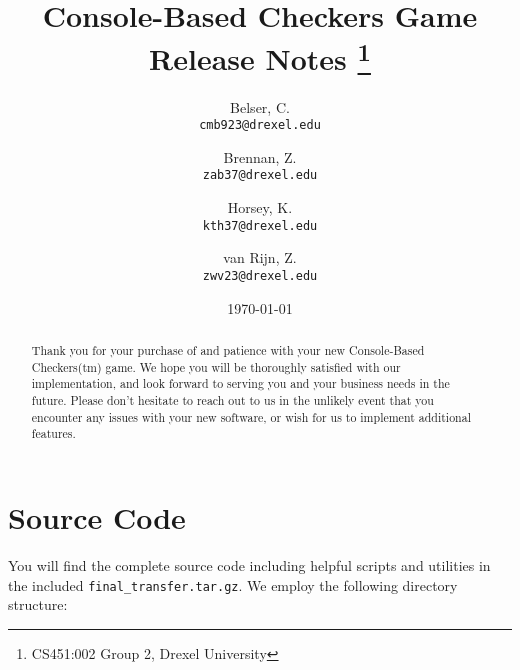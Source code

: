 \documentclass[letterpaper]{article}
\title{
    Console-Based Checkers Game\\
    Release Notes
    \footnote{CS451:002 Group 2, Drexel University}
}
\author{
    Belser, C.\\
    \texttt{cmb923@drexel.edu}
    \and
    Brennan, Z.\\
    \texttt{zab37@drexel.edu}
    \and
    Horsey, K.\\
    \texttt{kth37@drexel.edu}
    \and
    van Rijn, Z.\\
    \texttt{zwv23@drexel.edu}
}
\date{\today}
\begin{document}

\maketitle

\begin{abstract}

Thank you for your purchase of and patience with your new
Console-Based Checkers(tm) game. We hope you will be thoroughly
satisfied with our implementation, and look forward to serving
you and your business needs in the future. Please don't hesitate
to reach out to us in the unlikely event that you encounter any
issues with your new software, or wish for us to implement
additional features.

\end{abstract}


\section{Source Code}

You will find the complete source code including helpful scripts
and utilities in the included \texttt{final\_transfer.tar.gz}.
We employ the following directory structure:
\end{document}
